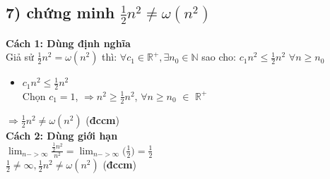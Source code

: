 \documentclass[10pt,a4paper]{article}
\begin{document}
\subsection*{7) chứng minh $\frac{1}{2}n^2 \ne \omega(n^2)$}
\textbf{Cách 1: Dùng định nghĩa}\\
Giả sử $\frac{1}{2}n^2 = \omega(n^2)$ thì: $\forall c_1 \in \mathbb{R^+},\exists n_0 \in \mathbb{N}$ sao cho: $c_1n^2\leq \frac{1}{2}n^2$ $\forall n \geq n_0$
\begin{itemize}
\item $c_1n^2\leq \frac{1}{2}n^2$ \\
Chọn $c_1 = 1$, $\Rightarrow n^2 \geq \frac{1}{2}n^2$, $\forall n \geq n_0$ $\in$ $\mathbb{R^+}$
\end{itemize}
$\Rightarrow \frac{1}{2}n^2 \ne \omega(n^2)$ (\textbf{đccm})\\
\textbf{Cách 2: Dùng giới hạn}\\
$\lim_{n->\infty}\frac{\frac{1}{2}n^2}{n^2} = \lim_{n->\infty}\big(\frac{1}{2}\big)= \frac{1}{2}$ \\
$\frac{1}{2}\ne \infty,  \frac{1}{2}n^2 \ne \omega(n^2)$ (\textbf{đccm})
\end{document}
